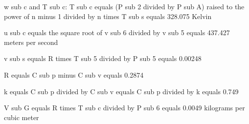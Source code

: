 w sub c and T sub c:
T sub c equals (P sub 2 divided by P sub A) raised to the power of n minus 1 divided by n times T sub s equals 328.075 Kelvin

u sub c equals the square root of v sub 6 divided by v sub 5 equals 437.427 meters per second

v sub s equals R times T sub 5 divided by P sub 5 equals 0.00248

R equals C sub p minus C sub v equals 0.2874

k equals C sub p divided by C sub v equals C sub p divided by k equals 0.749

V sub G equals R times T sub c divided by P sub 6 equals 0.0049 kilograms per cubic meter